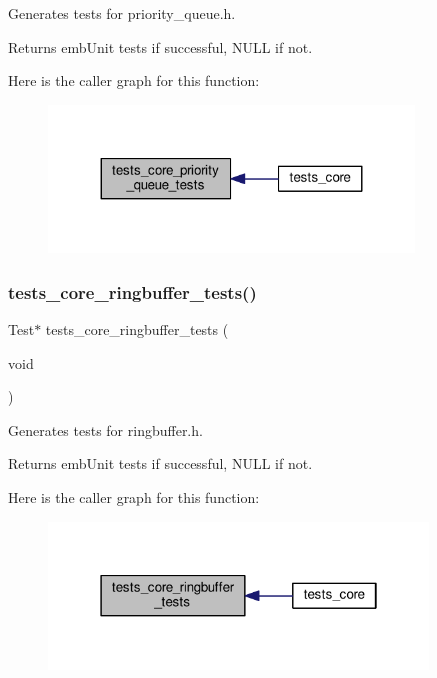 Generates tests for priority\+\_\+queue.\+h. 

\begin{DoxyReturn}{Returns}
emb\+Unit tests if successful, N\+U\+LL if not. 
\end{DoxyReturn}
Here is the caller graph for this function\+:
\nopagebreak
\begin{figure}[H]
\begin{center}
\leavevmode
\includegraphics[width=275pt]{group__unittests_ga5f7e66228b199fc4a8938d67b5bfbdce_icgraph}
\end{center}
\end{figure}
\mbox{\label{group__unittests_gafd9d608a22f7a35a7c85501b68bb0baf}} 
\subsubsection{\texorpdfstring{tests\+\_\+core\+\_\+ringbuffer\+\_\+tests()}{tests\_core\_ringbuffer\_tests()}}
{\footnotesize\ttfamily Test$\ast$ tests\+\_\+core\+\_\+ringbuffer\+\_\+tests (\begin{DoxyParamCaption}\item[{void}]{ }\end{DoxyParamCaption})}



Generates tests for ringbuffer.\+h. 

\begin{DoxyReturn}{Returns}
emb\+Unit tests if successful, N\+U\+LL if not. 
\end{DoxyReturn}
Here is the caller graph for this function\+:
\nopagebreak
\begin{figure}[H]
\begin{center}
\leavevmode
\includegraphics[width=286pt]{group__unittests_gafd9d608a22f7a35a7c85501b68bb0baf_icgraph}
\end{center}
\end{figure}
\mbox{\label{group__unittests_gaa3dd2eb88b82592a6fa7dd87aecd62b7}} 
